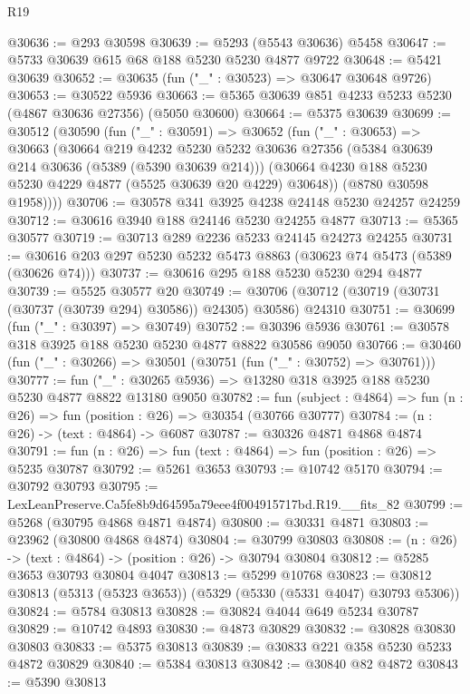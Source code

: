 \begin{lexlean}{R19}
\begin{coremodule}
@30636 := @293 @30598
@30639 := @5293 (@5543 @30636) @5458
@30647 := @5733 @30639 @615 @68 @188 @5230 @5230 @4877 @9722
@30648 := @5421 @30639
@30652 := @30635 (fun ("_" : @30523) => @30647 @30648 @9726)
@30653 := @30522 @5936
@30663 := @5365 @30639 @851 @4233 @5233 @5230 (@4867 @30636 @27356) (@5050 @30600)
@30664 := @5375 @30639
@30699 := @30512
    (@30590
      (fun ("_" : @30591) =>
      @30652
        (fun ("_" : @30653) =>
        @30663
          (@30664
            @219
            @4232
            @5230
            @5232
            @30636
            @27356
            (@5384 @30639 @214 @30636 (@5389 (@5390 @30639 @214)))
            (@30664 @4230 @188 @5230 @5230 @4229 @4877 (@5525 @30639 @20 @4229) @30648))
          (@8780 @30598 @1958))))
@30706 := @30578 @341 @3925 @4238 @24148 @5230 @24257 @24259
@30712 := @30616 @3940 @188 @24146 @5230 @24255 @4877
@30713 := @5365 @30577
@30719 := @30713 @289 @2236 @5233 @24145 @24273 @24255
@30731 := @30616 @203 @297 @5230 @5232 @5473 @8863 (@30623 @74 @5473 (@5389 (@30626 @74)))
@30737 := @30616 @295 @188 @5230 @5230 @294 @4877
@30739 := @5525 @30577 @20
@30749 := @30706 (@30712 (@30719 (@30731 (@30737 (@30739 @294) @30586)) @24305) @30586) @24310
@30751 := @30699 (fun ("_" : @30397) => @30749)
@30752 := @30396 @5936
@30761 := @30578 @318 @3925 @188 @5230 @5230 @4877 @8822 @30586 @9050
@30766 := @30460 (fun ("_" : @30266) => @30501 (@30751 (fun ("_" : @30752) => @30761)))
@30777 := fun ("_" : @30265 @5936) => @13280 @318 @3925 @188 @5230 @5230 @4877 @8822 @13180 @9050
@30782 := fun (subject : @4864) => fun (n : @26) => fun (position : @26) => @30354 (@30766 @30777)
@30784 := (n : @26) -> (text : @4864) -> @6087
@30787 := @30326 @4871 @4868 @4874
@30791 := fun (n : @26) => fun (text : @4864) => fun (position : @26) => @5235 @30787
@30792 := @5261 @3653
@30793 := @10742 @5170
@30794 := @30792 @30793
@30795 := LexLeanPreserve.Ca5fe8b9d64595a79eee4f004915717bd.R19.__fits_82
@30799 := @5268 (@30795 @4868 @4871 @4874)
@30800 := @30331 @4871
@30803 := @23962 (@30800 @4868 @4874)
@30804 := @30799 @30803
@30808 := (n : @26) -> (text : @4864) -> (position : @26) -> @30794 @30804
@30812 := @5285 @3653 @30793 @30804 @4047
@30813 := @5299 @10768
@30823 := @30812 @30813 (@5313 (@5323 @3653)) (@5329 (@5330 (@5331 @4047) @30793 @5306))
@30824 := @5784 @30813
@30828 := @30824 @4044 @649 @5234 @30787
@30829 := @10742 @4893
@30830 := @4873 @30829
@30832 := @30828 @30830 @30803
@30833 := @5375 @30813
@30839 := @30833 @221 @358 @5230 @5233 @4872 @30829
@30840 := @5384 @30813
@30842 := @30840 @82 @4872
@30843 := @5390 @30813

\end{coremodule}
\end{lexlean}
